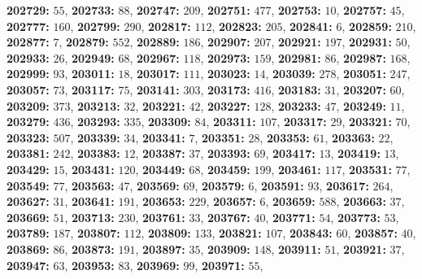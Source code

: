 \textsf{\bfseries 202729:} $55$, \textsf{\bfseries 202733:} $88$, \textsf{\bfseries 202747:} $209$, \textsf{\bfseries 202751:} $477$, \textsf{\bfseries 202753:} $10$, \textsf{\bfseries 202757:} $45$, \textsf{\bfseries 202777:} $160$, \textsf{\bfseries 202799:} $290$, \textsf{\bfseries 202817:} $112$, \textsf{\bfseries 202823:} $205$, \textsf{\bfseries 202841:} $6$, \textsf{\bfseries 202859:} $210$, \textsf{\bfseries 202877:} $7$, \textsf{\bfseries 202879:} $552$, \textsf{\bfseries 202889:} $186$, \textsf{\bfseries 202907:} $207$, \textsf{\bfseries 202921:} $197$, \textsf{\bfseries 202931:} $50$, \textsf{\bfseries 202933:} $26$, \textsf{\bfseries 202949:} $68$, \textsf{\bfseries 202967:} $118$, \textsf{\bfseries 202973:} $159$, \textsf{\bfseries 202981:} $86$, \textsf{\bfseries 202987:} $168$, \textsf{\bfseries 202999:} $93$, \textsf{\bfseries 203011:} $18$, \textsf{\bfseries 203017:} $111$, \textsf{\bfseries 203023:} $14$, \textsf{\bfseries 203039:} $278$, \textsf{\bfseries 203051:} $247$, \textsf{\bfseries 203057:} $73$, \textsf{\bfseries 203117:} $75$, \textsf{\bfseries 203141:} $303$, \textsf{\bfseries 203173:} $416$, \textsf{\bfseries 203183:} $31$, \textsf{\bfseries 203207:} $60$, \textsf{\bfseries 203209:} $373$, \textsf{\bfseries 203213:} $32$, \textsf{\bfseries 203221:} $42$, \textsf{\bfseries 203227:} $128$, \textsf{\bfseries 203233:} $47$, \textsf{\bfseries 203249:} $11$, \textsf{\bfseries 203279:} $436$, \textsf{\bfseries 203293:} $335$, \textsf{\bfseries 203309:} $84$, \textsf{\bfseries 203311:} $107$, \textsf{\bfseries 203317:} $29$, \textsf{\bfseries 203321:} $70$, \textsf{\bfseries 203323:} $507$, \textsf{\bfseries 203339:} $34$, \textsf{\bfseries 203341:} $7$, \textsf{\bfseries 203351:} $28$, \textsf{\bfseries 203353:} $61$, \textsf{\bfseries 203363:} $22$, \textsf{\bfseries 203381:} $242$, \textsf{\bfseries 203383:} $12$, \textsf{\bfseries 203387:} $37$, \textsf{\bfseries 203393:} $69$, \textsf{\bfseries 203417:} $13$, \textsf{\bfseries 203419:} $13$, \textsf{\bfseries 203429:} $15$, \textsf{\bfseries 203431:} $120$, \textsf{\bfseries 203449:} $68$, \textsf{\bfseries 203459:} $199$, \textsf{\bfseries 203461:} $117$, \textsf{\bfseries 203531:} $77$, \textsf{\bfseries 203549:} $77$, \textsf{\bfseries 203563:} $47$, \textsf{\bfseries 203569:} $69$, \textsf{\bfseries 203579:} $6$, \textsf{\bfseries 203591:} $93$, \textsf{\bfseries 203617:} $264$, \textsf{\bfseries 203627:} $31$, \textsf{\bfseries 203641:} $191$, \textsf{\bfseries 203653:} $229$, \textsf{\bfseries 203657:} $6$, \textsf{\bfseries 203659:} $588$, \textsf{\bfseries 203663:} $37$, \textsf{\bfseries 203669:} $51$, \textsf{\bfseries 203713:} $230$, \textsf{\bfseries 203761:} $33$, \textsf{\bfseries 203767:} $40$, \textsf{\bfseries 203771:} $54$, \textsf{\bfseries 203773:} $53$, \textsf{\bfseries 203789:} $187$, \textsf{\bfseries 203807:} $112$, \textsf{\bfseries 203809:} $133$, \textsf{\bfseries 203821:} $107$, \textsf{\bfseries 203843:} $60$, \textsf{\bfseries 203857:} $40$, \textsf{\bfseries 203869:} $86$, \textsf{\bfseries 203873:} $191$, \textsf{\bfseries 203897:} $35$, \textsf{\bfseries 203909:} $148$, \textsf{\bfseries 203911:} $51$, \textsf{\bfseries 203921:} $37$, \textsf{\bfseries 203947:} $63$, \textsf{\bfseries 203953:} $83$, \textsf{\bfseries 203969:} $99$, \textsf{\bfseries 203971:} $55$, 
